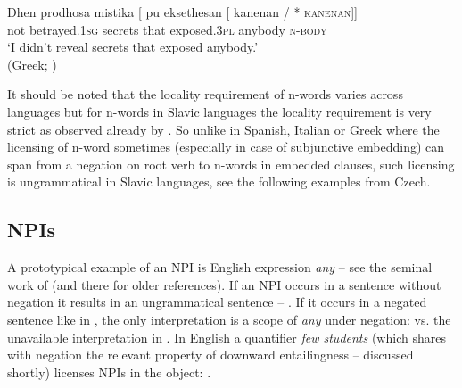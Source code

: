 \documentclass[output=paper,
]{langscibook}
\begin{document}
\ea \gll Dhen prodhosa mistika [\hspace{-2pt} pu eksethesan [\hspace{-2pt}  kanenan /\hspace{-2pt} *\hspace{-2pt} \textsc{kanenan}]]\\
not betrayed.\textsc{1sg} secrets {} that exposed.\textsc{3pl} {} anybody {} {} \textsc{n-body} {}\\
\glt `I didn't reveal secrets that exposed anybody.'\\\xspace\hfill (Greek; \citealt[18]{giannakidou2017landscape})
\z

\noindent It should be noted that the locality requirement of n-words varies across languages but for n-words in Slavic languages the  locality requirement is very strict  as observed already by \cite{progovac1993negative}. So unlike in Spanish, Italian or Greek where the licensing of n-word sometimes (especially in case of subjunctive embedding) can span from a negation on root verb to n-words in embedded clauses, such licensing is ungrammatical in Slavic languages, see the following examples from Czech.

\ea {}
\z
\z

\subsection{NPIs}\label{npis}

A prototypical example of an NPI is English expression \textit{any} -- see the seminal work of \cite{kadmon1993any} (and there for older references). If an NPI occurs in a sentence without negation it results in an ungrammatical sentence -- . If it occurs in a negated sentence like in , the only interpretation is a scope of \textit{any} under negation:  vs. the unavailable interpretation in . In English a quantifier \textit{few students} (which shares with negation the relevant property of downward entailingness -- discussed shortly) licenses NPIs in the object: .
\end{document}
